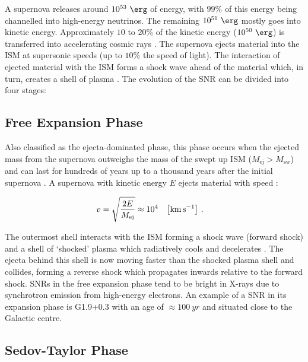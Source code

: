 A supernova releases around $10^{53}~\ergs$ of energy, with $99\%$ of this energy being channelled into high-energy neutrinos. The remaining $10^{51}~\ergs$ mostly goes into kinetic energy. Approximately $10$ to $20\%$ of the kinetic energy ($10^{50}~\ergs$) is transferred into accelerating cosmic rays \citep{2012SSRv..173..369H}. The supernova ejects material into the ISM at supersonic speeds (up to $10\%$ the speed of light). The interaction of ejected material with the ISM forms a shock wave ahead of the material which, in turn, creates a shell of plasma \citep{alma9928040781501811}. The evolution of the SNR can be divided into four stages:

\subsection{Free Expansion Phase}

Also classified as the ejecta-dominated phase, this phase occurs when the ejected mass from the supernova outweighs the mass of the swept up ISM ($M_\text{ej}>M_\text{sw}$) and can last for hundreds of years up to a thousand years after the initial supernova \citep{2008ARA&A..46...89R}. A supernova with kinetic energy $E$ ejects material with speed \citep{2022arXiv221102217B}:

\begin{equation}
    \begin{aligned}
        v&=\sqrt{\frac{2E}{M_\text{ej}}}\approx 10^4\quad\qty[\si{\kilo\meter\per\second}]\text{ .} 
    \end{aligned}
\end{equation}

The outermost shell interacts with the ISM forming a shock wave (forward shock) and a shell of `shocked' plasma which radiatively cools and decelerates  \citep{1972ARA&A..10..129W}. The ejecta behind this shell is now moving faster than the shocked plasma shell and collides, forming a reverse shock which propagates inwards relative to the forward shock. SNRs in the free expansion phase tend to be bright in X-rays due to synchrotron emission from high-energy electrons. An example of a SNR in its expansion phase is \mbox{G1.9+0.3} with an age of  $\approx 100~\si{yr}$ and situated close to the Galactic centre. \citep{2008ApJ...680L..41R}

\subsection{Sedov-Taylor Phase}

